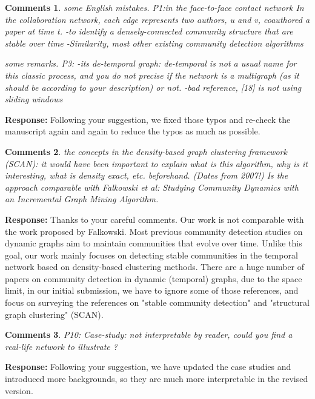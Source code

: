 \documentclass{article}
\newtheorem{Comments}{\textbf{Comments}}
\begin{document}
\begin{Comments}
	
some English mistakes.
P1:in the face-to-face contact network
In the collaboration network, each edge represents two authors, u and v, coauthored a paper at time t.
-to identify a densely-connected community structure that are stable over time
-Similarity, most other existing community detection algorithms

some remarks.
P3:
-its de-temporal graph: de-temporal is not a usual name for this classic process, and you do not precise if the network is a multigraph (as it should be according to your description) or not.
-bad reference, [18] is not using sliding windows

\end{Comments}
\noindent \textbf{Response: } Following your suggestion, we fixed those typos and re-check the manuscript again and again to reduce the typos as much as possible.

\begin{Comments}
	the concepts in the density-based graph clustering framework (SCAN): it would have been important to explain what is this algorithm, why is it interesting, what is density exact, etc. beforehand. (Dates from 2007!)
	Is the approach comparable with Falkowski et al: Studying Community Dynamics with an Incremental Graph Mining Algorithm.
	
\end{Comments}
\noindent \textbf{Response: } Thanks to your careful comments. Our work is not comparable with the work proposed by Falkowski. Most previous community detection studies on dynamic graphs aim to maintain communities that evolve over time. Unlike this goal, our work mainly focuses on detecting stable communities in the temporal network based on density-based clustering methods. There are a huge number of papers on community detection in dynamic (temporal) graphs, due to the space limit, in our initial submission, we have to ignore some of those references, and focus on surveying the references on "stable community detection" and "structural graph clustering" (SCAN).


\begin{Comments}
	
	P10: Case-study: not interpretable by reader, could you find a real-life network to illustrate ?
\end{Comments}
\noindent \textbf{Response: } Following your suggestion, we have updated the case studies and introduced more backgrounds, so they are much more interpretable in the revised version.
\end{document}
